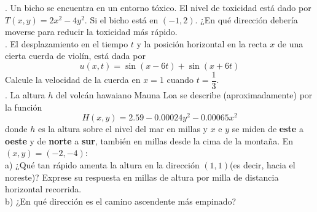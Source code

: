 \documentclass[letterpaper]{article}
\renewcommand{\*}{\cdot}
\theoremstyle{definition}
\begin{document}
. Un bicho se encuentra en un entorno tóxico. El nivel de toxicidad está dado por $ T(x,y) = 2x^2 - 4y^2 $. Si el bicho está en $ (-1,2) $. ¿En qué dirección debería moverse para reducir la toxicidad más rápido.\\

. El desplazamiento en el tiempo $ t $ y la posición horizontal en la recta $ x $ de una cierta cuerda de violín, está dada por $$ u(x,t) = \sin(x - 6t) + \sin(x+6t) $$ Calcule la velocidad de la cuerda en $ x = 1 $ cuando $ t = \dfrac{1}{3} $.\\

. La altura $ h $ del volcán hawaiano Mauna Loa se describe (aproximadamente) por la función $$ H(x,y) = 2.59 - 0.00024y^2 - 0.00065x^2 $$donde $ h $ es la altura sobre el nivel del mar en millas y $ x $ e $ y $ se miden de \textbf{este} a \textbf{oeste} y de \textbf{norte} a \textbf{sur}, también en millas desde la cima de la montaña. En $ (x,y) = (-2,-4) $:\\

a) ¿Qué tan rápido amenta la altura en la dirección $ (1,1) $(es decir, hacia el noreste)? Exprese su respuesta en millas de altura por milla de distancia horizontal recorrida.\\

b) ¿En qué dirección es el camino ascendente más empinado?
\end{document}

